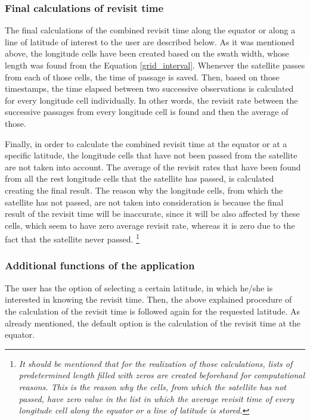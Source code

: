\bigskip
\subsubsection{Final calculations of revisit time}
\bigskip

The final calculations of the combined revisit time along the equator or along a line of latitude of interest to the user are described below. As it was mentioned above, the longitude cells have been created based on the swath width, whose length was found from the Equation \ref{grid_interval}. Whenever the satellite passes from each of those cells, the time of passage is saved. Then, based on those timestamps, the time elapsed between two successive observations is calculated for every longitude cell individually. In other words, the revisit rate between the successive passages from every longitude cell is found and then the average of those.

Finally, in order to calculate the combined revisit time at the equator or at a specific latitude, the longitude cells that have not been passed from the satellite are not taken into account. The average of the revisit rates that have been found from all the rest longitude cells that the satellite has passed, is calculated creating the final result. The reason why the longitude cells, from which the satellite has not passed, are not taken into consideration is because the final result of the revisit time will be inaccurate, since it will be also affected by these cells, which seem to have zero average revisit rate, whereas it is zero due to the fact that the satellite never passed. \footnote{\label{Flock_source}\textit{It should be mentioned that for the realization of those calculations, lists of predetermined length filled with zeros are created beforehand for computational reasons. This is the reason why the cells, from which the satellite has not passed, have zero value in the list in which the average revisit time of every longitude cell along the equator or a line of latitude is stored.}}


\bigskip
\subsubsection{Additional functions of the application}
\bigskip
The user has the option of selecting a certain latitude, in which he/she is interested in knowing the revisit time. Then, the above explained procedure of the calculation of the revisit time is followed again for the requested latitude. As already mentioned, the default option is the calculation of the revisit time at the equator.

